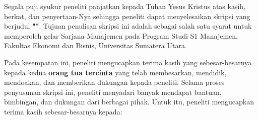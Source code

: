 \begin{katapengantar}
    Segala puji syukur peneliti panjatkan kepada Tuhan Yesus Kristus atas kasih, berkat, dan penyertaan-Nya sehingga peneliti dapat menyelesaikan skripsi yang berjudul \textbf{"\judulindonesiatext"}. Tujuan penulisan skripsi ini adalah sebagai salah satu syarat untuk memperoleh gelar Sarjana Manajemen pada Program Studi S1 Manajemen, Fakultas Ekonomi dan Bisnis, Universitas Sumatera Utara.

    Pada kesempatan ini, peneliti mengucapkan terima kasih yang sebesar-besarnya kepada kedua \textbf{orang tua tercinta} yang telah membesarkan, mendidik, mendoakan, dan memberikan dukungan kepada peneliti. Selama proses penyusunan skripsi ini, peneliti menyadari banyak mendapat bantuan, bimbingan, dan dukungan dari berbagai pihak. Untuk itu, peneliti mengucapkan terima kasih sebesar-besarnya kepada:


\end{katapengantar}
